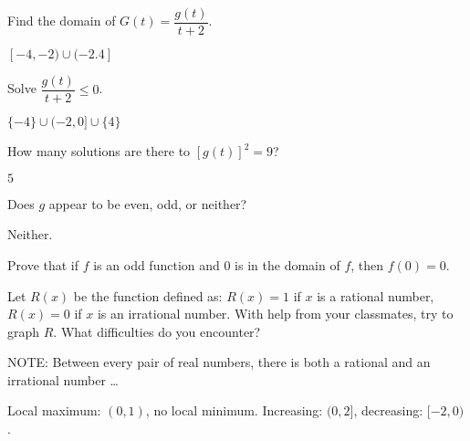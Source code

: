 \documentclass{ximera}
\begin{document}
\begin{question}
Find the domain of $G(t) = \dfrac{g(t)}{t+2}$.
\begin{solution}
$[-4,-2) \cup (-2.4]$

\end{solution}

\end{question}

\begin{question}
Solve $\dfrac{g(t)}{t+2} \leq 0$.

\begin{solution}
$\{-4\} \cup (-2,0] \cup \{4\}$
\end{solution}

\end{question}

\begin{question}
How many solutions are there to $[g(t)]^2 = 9$?
\begin{solution}
$5$
\end{solution}

\end{question}

\begin{question}\label{usesecondfuncgraphlast}
Does $g$ appear to be even, odd, or neither?

\begin{solution}
Neither.

\end{solution}

\end{question}

\begin{question}
Prove that if $f$ is an odd function and $0$ is in the domain of $f$, then $f(0) = 0$.
\begin{solution}
\end{solution}

\end{question}

\begin{question}
Let $R(x)$ be the function defined as:  $R(x) = 1$ if $x$ is a rational number, $R(x) = 0$ if $x$ is an irrational number. With help from your classmates, try to graph $R$.  What difficulties do you encounter?

NOTE:  Between every pair of real numbers, there is both a rational and an irrational number \ldots


\begin{solution}
Local maximum: $(0,1)$, no local minimum.  Increasing: $(0,2]$, decreasing: $[-2,0)$.
\end{solution}

\end{question}
\end{document}
